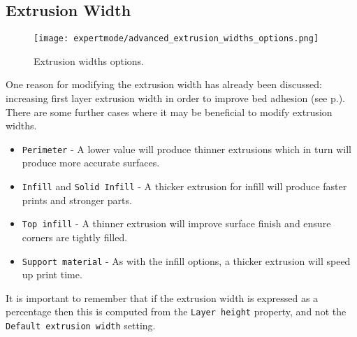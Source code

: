 
\subsection{Extrusion Width} %
\label{sec:extrusion_width}

\begin{figure}[H]
\centering
\texttt{[image: expertmode/advanced\_extrusion\_widths\_options.png]}
\caption{Extrusion widths options.}
\label{fig:advanced_extrusion_widths_options}
\end{figure}

One reason for modifying the extrusion width has already been discussed: increasing first layer extrusion width in order to improve bed adhesion (see p.\pageref{par:wider_extrusion_width}).  There are some further cases where it may be beneficial to modify extrusion widths.
\begin{itemize}
    \item \texttt{Perimeter} - A lower value will produce thinner extrusions which in turn will produce more accurate surfaces.
    \item \texttt{Infill} and \texttt{Solid Infill} - A thicker extrusion for infill will produce faster prints and stronger parts.
    \item \texttt{Top infill} - A thinner extrusion will improve surface finish and ensure corners are tightly filled.
    \item \texttt{Support material} - As with the infill options, a thicker extrusion will speed up print time.
\end{itemize}

It is important to remember that if the extrusion width is expressed as a percentage then this is computed from the \texttt{Layer height} property, and not the \texttt{Default extrusion width} setting.

